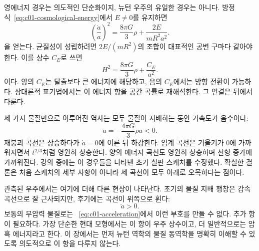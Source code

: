 영에너지 경우는 의도적인 단순화이지, 뉴턴 우주의 유일한 경우는 아니다. 방정식~\eqref{eq:c01-cosmological-energy}에서 \(E\neq0\)를 유지하면 \begin{equation}
\left(\frac{\dot a}{a}\right)^2
=\frac{8\pi G}{3}\rho+\frac{2E}{mR^2a^2}.
\label{eq:c01-nonzero-energy}
\end{equation}을 얻는다. 균질성이 성립하려면 \(2E/(mR^2)\)의 조합이 대표적인 공변 구마다 같아야 한다. 이를 상수 \(C_E\)로 쓰면 \begin{equation}
H^2=\frac{8\pi G}{3}\rho+\frac{C_E}{a^2}.
\end{equation}이다. 양의 \(C_E\)는 탈출보다 큰 에너지에 해당하고, 음의 \(C_E\)에서는 방향 전환이 가능하다. 상대론적 표기법에서는 이 에너지 항을 공간 곡률로 재해석한다. 그 연결은 뒤에서 다룬다.

세 가지 물질만으로 이루어진 역사는 모두 물질이 지배하는 동안 가속도가 음수이다:
\begin{equation}
\ddot a=-\frac{4\pi G}{3}\rho a<0.
\end{equation}
재붕괴 곡선은 상승하다가 \(\dot a=0\)에 이른 뒤 하강한다. 임계 곡선은 기울기가 0에 가까워지면서 \(t^{2/3}\)처럼 영원히 상승한다. 양의 에너지 곡선도 영원히 상승하며 선형 증가에 가까워진다. 강의 중에는 이 경우들을 나타낸 초기 칠판 스케치를 수정했다. 확실한 결론은 처음 스케치의 세부 사항이 아니라 세 곡선이 모두 아래로 오목하다는 점이다.

관측된 우주에서는 여기에 더해 다른 현상이 나타난다. 초기의 물질 지배 팽창은 감속 곡선으로 잘 근사되지만, 후기에는 곡선이 위쪽으로 휜다:
\begin{equation}
\ddot a>0.
\end{equation}
보통의 무압력 물질로는 ~\eqref{eq:c01-acceleration}에서 이런 부호를 만들 수 없다. 추가 항이 필요하다. 가장 단순한 현대 모형에서는 이 항이 우주 상수이고, 더 일반적으로는 암흑 에너지라고 한다. 이 장에서는 먼저 뉴턴 역학의 물질 동역학을 명확히 이해할 수 있도록 의도적으로 이 항을 다루지 않는다.

\begin{classroomqa}
\end{classroomqa}

